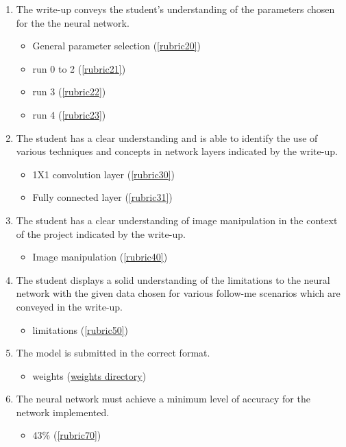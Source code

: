 \documentclass[paper=a4, fontsize=11pt]{scrartcl} %
\numberwithin{equation}{section} %
\numberwithin{figure}{section} %
\numberwithin{table}{section} %
\begin{document}
\begin{enumerate}
\begin{itemize}
	\end{itemize}
	\item The write-up conveys the student's understanding of the parameters chosen for the the neural network.  
	\begin{itemize} %
		\item General parameter selection (\ref{rubric20})
		\item run 0 to 2 (\ref{rubric21})
		\item run 3 (\ref{rubric22})
		\item run 4 (\ref{rubric23})
	\end{itemize}
	\item The student has a clear understanding and is able to identify the use of various techniques and concepts in network layers indicated by the write-up.  
	\begin{itemize} %
		\item 1X1 convolution layer (\ref{rubric30})
		\item Fully connected layer (\ref{rubric31})
	\end{itemize}
	\item The student has a clear understanding of image manipulation in the context of the project indicated by the write-up.  
	\begin{itemize} %
		\item Image manipulation (\ref{rubric40})
	\end{itemize}
	\item The student displays a solid understanding of the limitations to the neural network with the given data chosen for various follow-me scenarios which are conveyed in the write-up.
	\begin{itemize} %
		\item limitations (\ref{rubric50})
	\end{itemize}
	\item The model is submitted in the correct format.
	\begin{itemize} %
		\item weights (\href{run:../data/weights}{weights directory})
	\end{itemize}
	\item The neural network must achieve a minimum level of accuracy for the network implemented. 
	\begin{itemize} %
		\item 43\% (\ref{rubric70})
	\end{itemize}
 \end{enumerate}
 
\end{document}
